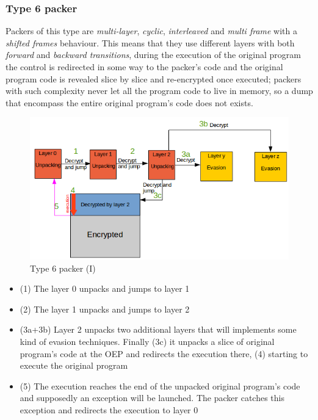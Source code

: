 \subsubsection{Type 6 packer}
Packers of this type are \textit{multi-layer}, \textit{cyclic}, \textit{interleaved} and \textit{multi frame} with a \textit{shifted frames} behaviour. This means that they use different layers with both \textit{forward} and \textit{backward transitions}, during the execution of the original program the control is redirected in some way to the packer's code and the original program code is revealed slice by slice and re-encrypted once executed; packers with such complexity never let all the program code to live in memory, so a dump that encompass the entire original program's code does not exists.
\begin{figure}[!ht]
	\begin{center}
		\includegraphics[width=\textwidth]{pictures/packer_type_5-1.png}
	\end{center}
	\caption{Type 6 packer (I)}
\end{figure}
\begin{itemize}
\item (1) The layer 0 unpacks and jumps to layer 1
\item (2) The layer 1 unpacks and jumps to layer 2
\item (3a+3b) Layer 2 unpacks two additional layers that will implements some kind of evasion techniques. Finally (3c) it unpacks a slice of original program's code at the \ac{OEP} and redirects the execution there, (4) starting to execute the original program
\item (5) The execution reaches the end of the unpacked original program's code and supposedly an exception will be launched. The packer catches this exception and redirects the execution to layer 0
\end{itemize}
